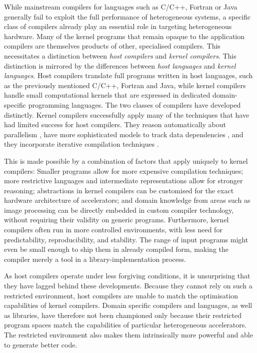     While mainstream compilers for languages such as C/C++, Fortran or Java
    generally fail to exploit the full performance of heterogeneous systems, a
    specific class of compilers already play an essential role in
    targeting heterogeneous hardware.
    Many of the kernel programs that remain opaque to the application compilers
    are themselves products of other, specialised compilers.
    This necessitates a distinction between {\em host compilers} and {\em kernel
    compilers}.
    This distinction is mirrored by the differences between {\em host languages}
    and {\em kernel languages}.
    Host compilers translate full programs written in host languages,
    such as the previously mentioned C/C++, Fortran and Java, while kernel
    compilers handle small computational kernels that are expressed in dedicated
    domain-specific programming languages.
    The two classes of compilers have developed distinctly.
    Kernel compilers successfully apply many of the techniques that have had
    limited success for host compilers.
    They reason automatically about parallelism
    \citep{Steuwer:2017:LFD:3049832.3049841}, have more sophisticated models to
    track data dependencies \citep{Baghdadi:2019:TPC:3314872.3314896}, and they
    incorporate iterative compilation techniques
    \citep{Ansel:2014:OEF:2628071.2628092}.

    This is made possible by a combination of factors that apply uniquely to
    kernel compilers:
    Smaller programs allow for more expensive compilation techniques;
    more restrictive languages and intermediate representations allow for
    stronger reasoning;
    abstractions in kernel compilers can be customised for the exact hardware
    architecture of accelerators;
    and domain knowledge from areas such as image processing can be directly
    embedded in custom compiler technology, without requiring their validity
    on generic programs.
    Furthermore, kernel compilers often run in more controlled environments,
    with less need for predictability, reproducibility, and stability.
    The range of input programs might even be small enough to ship them in
    already compiled form, making the compiler merely a tool in a
    library-implementation process.

    As host compilers operate under less forgiving conditions, it is
    unsurprising that they have lagged behind these developments.
    Because they cannot rely on such a restricted environment, host compilers
    are unable to match the optimisation capabilities of kernel compilers.
    Domain specific compilers and languages, as well as libraries, have
    therefore not been championed only because their restricted program
    spaces match the capabilities of particular heterogeneous accelerators.
    The restricted environment also makes them intrinsically more powerful and
    able to generate better code.

